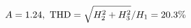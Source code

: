 \documentclass[preview]{standalone}
\begin{document}
\begin{align*}
\special{dvisvgm:raw <g id='unique000'>}A=1.24,\ \text{THD}=\sqrt{H_2^2+H_3^2}/H_1=20.3\%\special{dvisvgm:raw </g>}
\end{align*}
\end{document}
